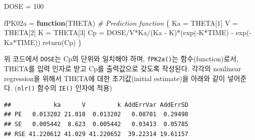 \documentclass[
  11pt,
  krantz2, a4paper, twoside]{krantz}
\newenvironment{Shaded}{\begin{snugshade}}{\end{snugshade}}
\newcommand{\AttributeTok}[1]{\textcolor[rgb]{0.77,0.63,0.00}{#1}}
\newcommand{\CommentTok}[1]{\textcolor[rgb]{0.56,0.35,0.01}{\textit{#1}}}
\newcommand{\ControlFlowTok}[1]{\textcolor[rgb]{0.13,0.29,0.53}{\textbf{#1}}}
\newcommand{\DecValTok}[1]{\textcolor[rgb]{0.00,0.00,0.81}{#1}}
\newcommand{\FloatTok}[1]{\textcolor[rgb]{0.00,0.00,0.81}{#1}}
\newcommand{\FunctionTok}[1]{\textcolor[rgb]{0.00,0.00,0.00}{#1}}
\newcommand{\NormalTok}[1]{#1}
\newcommand{\OtherTok}[1]{\textcolor[rgb]{0.56,0.35,0.01}{#1}}
\newcommand{\SpecialCharTok}[1]{\textcolor[rgb]{0.00,0.00,0.00}{#1}}
\newcommand{\StringTok}[1]{\textcolor[rgb]{0.31,0.60,0.02}{#1}}
\theoremstyle{definition}
\theoremstyle{definition}
\theoremstyle{definition}
\theoremstyle{definition}
\theoremstyle{remark}
\begin{document}
\begin{Shaded}
\begin{Highlighting}[]
\NormalTok{DOSE }\OtherTok{=} \DecValTok{100}

\NormalTok{fPK02a }\OtherTok{=} \ControlFlowTok{function}\NormalTok{(THETA) }\CommentTok{\# Prediction function}
\NormalTok{\{}
\NormalTok{  Ka }\OtherTok{=}\NormalTok{ THETA[}\DecValTok{1}\NormalTok{]}
\NormalTok{  V  }\OtherTok{=}\NormalTok{ THETA[}\DecValTok{2}\NormalTok{]}
\NormalTok{  K  }\OtherTok{=}\NormalTok{ THETA[}\DecValTok{3}\NormalTok{]}
\NormalTok{  Cp }\OtherTok{=}\NormalTok{ DOSE}\SpecialCharTok{/}\NormalTok{V}\SpecialCharTok{*}\NormalTok{Ka}\SpecialCharTok{/}\NormalTok{(Ka }\SpecialCharTok{{-}}\NormalTok{ K)}\SpecialCharTok{*}\NormalTok{(}\FunctionTok{exp}\NormalTok{(}\SpecialCharTok{{-}}\NormalTok{K}\SpecialCharTok{*}\NormalTok{TIME) }\SpecialCharTok{{-}} \FunctionTok{exp}\NormalTok{(}\SpecialCharTok{{-}}\NormalTok{Ka}\SpecialCharTok{*}\NormalTok{TIME))}
  \FunctionTok{return}\NormalTok{(Cp)}
\NormalTok{\}}
\end{Highlighting}
\end{Shaded}

위 코드에서 \texttt{DOSE}는 Cp의 단위와 일치해야 하며, \texttt{fPK2a()}는 함수(function)로서, THETA를 입력 인자로 받고 Cp를 출력값으로 갖도록 작성된다.
각각의 nonlinear regression을 위해서 THETA에 대한 초기값(initial estimate)을 아래와 같이 넣어준다. (\texttt{nlr()} 함수의 \texttt{IE()} 인자에 적용)

\begin{Shaded}
\end{Shaded}

\begin{verbatim}
##            ka      V         k AddErrVar AddErrSD
## PE   0.013202 21.018  0.013202   0.08701  0.29498
## SE   0.005442  8.623  0.005442   0.03413  0.05785
## RSE 41.220612 41.029 41.220652  39.22314 19.61157
\end{verbatim}
\end{document}
